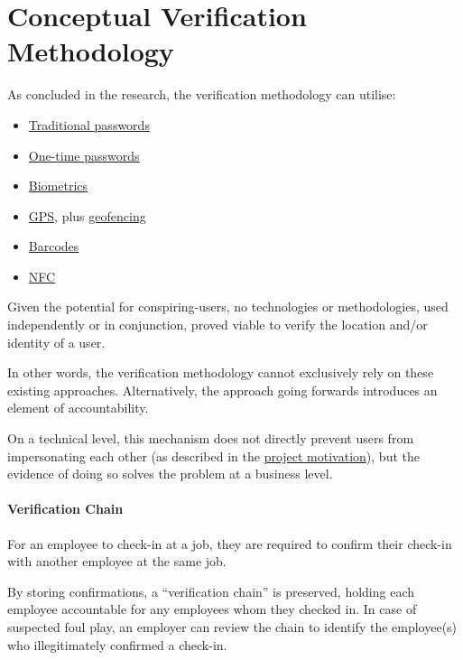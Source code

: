 \section{Conceptual Verification Methodology}

As concluded in the research, the verification methodology
can utilise: 

\begin{itemize} 

  \item \hyperref[ss:passwords]{Traditional passwords}

  \item \hyperref[ss:otp]{One-time passwords}

  \item \hyperref[ss:biometrics]{Biometrics}

  \item \hyperref[ss:gps]{GPS}, plus
        \hyperref[ss:geofencing]{geofencing} 

  \item \hyperref[ss:barcodes]{Barcodes} 

  \item \hyperref[ss:nfc]{NFC} 

\end{itemize} 

Given the potential for \gls{conspiring-users}, no
technologies or methodologies, used independently or in
conjunction, proved viable to verify the location and/or
identity of a user.

In other words, the verification methodology cannot
exclusively rely on these existing approaches.
Alternatively, the approach going forwards introduces an
element of accountability.

On a technical level, this mechanism does not directly
prevent users from impersonating each other (as described
in the \hyperref[s:motivation]{project motivation}), but
the evidence of doing so solves the problem at a business
level.

\paragraph{Verification Chain}

For an employee to \gls{check-in} at a job, they are
required to confirm their check-in with another employee at
the same job.

By storing confirmations, a \enquote{verification chain} is
preserved, holding each employee accountable for any
employees whom they checked in.
In case of suspected foul play, an employer can review the
chain to identify the employee(s) who illegitimately
confirmed a check-in.

